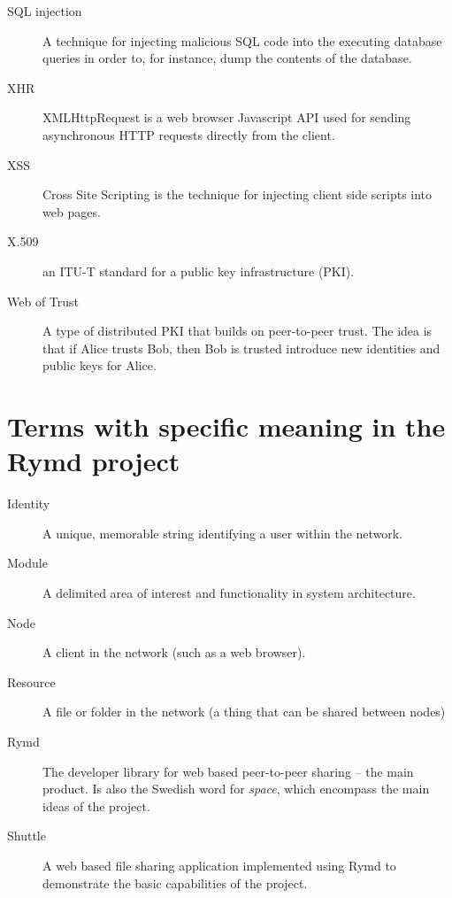 \begin{description}
  \item[SQL injection] A technique for injecting malicious SQL code into the executing database queries in order to, for instance, dump the contents of the database.
  \item[XHR] XMLHttpRequest is a web browser Javascript API used for sending asynchronous HTTP requests directly from the client.
  \item[XSS] Cross Site Scripting is the technique for injecting client side scripts into web pages.
  \item[X.509] an ITU-T standard for a public key infrastructure (PKI).
  \item[Web of Trust] A type of distributed PKI that builds on peer-to-peer trust. The idea is that if Alice trusts Bob, then Bob is trusted introduce new identities and public keys for Alice.

\end{description}

\section*{Terms with specific meaning in the Rymd project}
\begin{description}
  \item[Identity] A unique, memorable string identifying a user within the network.
  \item[Module] A delimited area of interest and functionality in system architecture.
  \item[Node] A client in the network (such as a web browser).
  \item[Resource] A file or folder in the network (a thing that can be shared between nodes)
  \item[Rymd] The developer library for web based peer-to-peer sharing – the main product. Is also the Swedish word for \emph{space}, which encompass the main ideas of the project.
  \item[Shuttle] A web based file sharing application implemented using Rymd to demonstrate the basic capabilities of the project.
\end{description}
